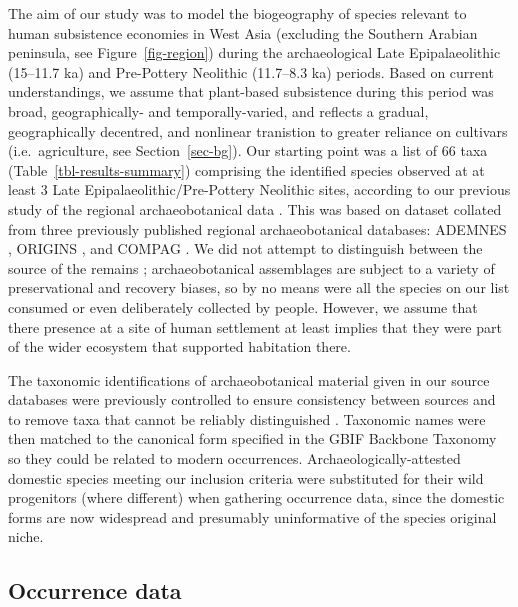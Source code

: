 \documentclass[
  authoryear,
  preprint]{elsarticle}
\begin{document}
The aim of our study was to model the biogeography of species relevant
to human subsistence economies in West Asia (excluding the Southern
Arabian peninsula, see Figure~\ref{fig-region}) during the
archaeological Late Epipalaeolithic (15--11.7 ka) and Pre-Pottery
Neolithic (11.7--8.3 ka) periods. Based on current understandings, we
assume that plant-based subsistence during this period was broad,
geographically- and temporally-varied, and reflects a gradual,
geographically decentred, and nonlinear tranistion to greater reliance
on cultivars (i.e.~agriculture, see Section~\ref{sec-bg}). Our starting
point was a list of 66 taxa (Table~\ref{tbl-results-summary}) comprising
the identified species observed at at least 3 Late
Epipalaeolithic/Pre-Pottery Neolithic sites, according to our previous
study of the regional archaeobotanical data
\citep{ArranzOtaeguiRoe2023}. This was based on dataset collated from
three previously published regional archaeobotanical databases: ADEMNES
\citep{ADEMNES}, ORIGINS \citep{ORIGINS}, and COMPAG
\citetext{\citealp{LucasFuller2018}; \citealp{FullerEtAl2018}; \citealp[based
on][]{ColledgeEtAl2004}; \citealp{ShennanConolly2007}}. We did not
attempt to distinguish between the source of the remains
\citep[cf.][]{WallaceEtAl2018}; archaeobotanical assemblages are subject
to a variety of preservational and recovery biases, so by no means were
all the species on our list consumed or even deliberately collected by
people. However, we assume that there presence at a site of human
settlement at least implies that they were part of the wider ecosystem
that supported habitation there.

The taxonomic identifications of archaeobotanical material given in our
source databases were previously controlled to ensure consistency
between sources and to remove taxa that cannot be reliably distinguished
\citep[for details see][]{ArranzOtaeguiRoe2023}. Taxonomic names were
then matched to the canonical form specified in the GBIF Backbone
Taxonomy \citep{GBIFSecretariat2023} so they could be related to modern
occurrences. Archaeologically-attested domestic species meeting our
inclusion criteria were substituted for their wild progenitors (where
different) when gathering occurrence data, since the domestic forms are
now widespread and presumably uninformative of the species original
niche.

\subsection{Occurrence data}\label{sec-occ-data}
\end{document}
